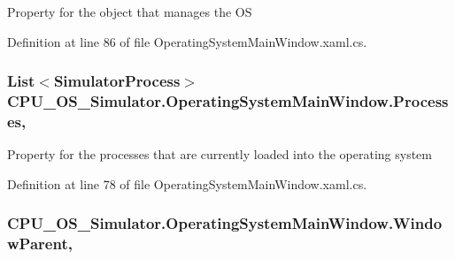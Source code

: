 Property for the object that manages the O\+S 



Definition at line 86 of file Operating\+System\+Main\+Window.\+xaml.\+cs.

\hypertarget{class_c_p_u___o_s___simulator_1_1_operating_system_main_window_aadbbb1f580d767211e180a95ec71b849}{}
\subsubsection[{Processes}]{\setlength{\rightskip}{0pt plus 5cm}List$<${\bf Simulator\+Process}$>$ C\+P\+U\+\_\+\+O\+S\+\_\+\+Simulator.\+Operating\+System\+Main\+Window.\+Processes\hspace{0.3cm}{\ttfamily [get]}, {\ttfamily [set]}}\label{class_c_p_u___o_s___simulator_1_1_operating_system_main_window_aadbbb1f580d767211e180a95ec71b849}


Property for the processes that are currently loaded into the operating system 



Definition at line 78 of file Operating\+System\+Main\+Window.\+xaml.\+cs.

\hypertarget{class_c_p_u___o_s___simulator_1_1_operating_system_main_window_ab268729468fdd46d53fa8a562f99bda1}{}
\subsubsection[{Window\+Parent}]{ C\+P\+U\+\_\+\+O\+S\+\_\+\+Simulator.\+Operating\+System\+Main\+Window.\+Window\+Parent\hspace{0.3cm}{\ttfamily [get]}, {\ttfamily [set]}}\label{class_c_p_u___o_s___simulator_1_1_operating_system_main_window_ab268729468fdd46d53fa8a562f99bda1}


